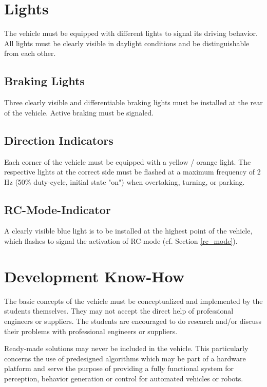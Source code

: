 \section{Lights}

The vehicle must be equipped with different lights to signal its driving
behavior. All lights must be clearly visible in daylight conditions and be
distinguishable from each other.

\subsection{Braking Lights}

Three clearly visible and differentiable braking lights must be installed at
the rear of the vehicle. Active braking must be signaled.

\subsection{Direction Indicators}

Each corner of the vehicle must be equipped with a yellow / orange light. The
respective lights at the correct side must be flashed at a maximum frequency of
2 Hz (50\% duty-cycle, initial state "on") when overtaking, turning, or
parking.

\subsection{RC-Mode-Indicator}

A clearly visible blue light is to be installed at the highest point of the
vehicle, which flashes to signal the activation of RC-mode (cf. Section
\ref{rc_mode}).

\section{Development Know-How}
\label{dev_know_how}

The basic concepts of the vehicle must be conceptualized and implemented by the
students themselves. They may not accept the direct help of professional
engineers or suppliers. The students are encouraged to do research and/or
discuss their problems with professional engineers or suppliers.

Ready-made solutions may never be included in the vehicle. This particularly
concerns the use of predesigned algorithms which may be part of a hardware
platform and serve the purpose of providing a fully functional system for
perception, behavior generation or control for automated vehicles or robots.

